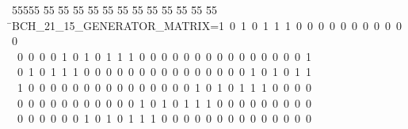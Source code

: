 %
%
\begin{tabbing}
55555 \= 55 \= 55 \= 55 \= 55 \= 55 \= 55 \= 55 \= 55 \= 55 \= 55 \= 55 \= 55 \= \>BCH\_21\_15\_GENERATOR\_MATRIX=1\ 0\ 1\ 0\ 1\ 1\ 1\ 0\ 0\ 0\ 0\ 0\ 0\ 0\ 0\ 0\ 0\ 0\\[0pt]
\>\ 0\ 0\ 0\ 0\ 1\ 0\ 1\ 0\ 1\ 1\ 1\ 0\ 0\ 0\ 0\ 0\ 0\ 0\ 0\ 0\ 0\ 0\ 0\ 0\ 0\ 0\ 1\\[0pt]
\>\ 0\ 1\ 0\ 1\ 1\ 1\ 0\ 0\ 0\ 0\ 0\ 0\ 0\ 0\ 0\ 0\ 0\ 0\ 0\ 0\ 0\ 1\ 0\ 1\ 0\ 1\ 1\\[0pt]
\>\ 1\ 0\ 0\ 0\ 0\ 0\ 0\ 0\ 0\ 0\ 0\ 0\ 0\ 0\ 0\ 0\ 1\ 0\ 1\ 0\ 1\ 1\ 1\ 0\ 0\ 0\ 0\\[0pt]
\>\ 0\ 0\ 0\ 0\ 0\ 0\ 0\ 0\ 0\ 0\ 0\ 1\ 0\ 1\ 0\ 1\ 1\ 1\ 0\ 0\ 0\ 0\ 0\ 0\ 0\ 0\ 0\\[0pt]
\>\ 0\ 0\ 0\ 0\ 0\ 0\ 1\ 0\ 1\ 0\ 1\ 1\ 1\ 0\ 0\ 0\ 0\ 0\ 0\ 0\ 0\ 0\ 0\ 0\ 0\ 0\ 0\\[0pt]

\end{tabbing}
